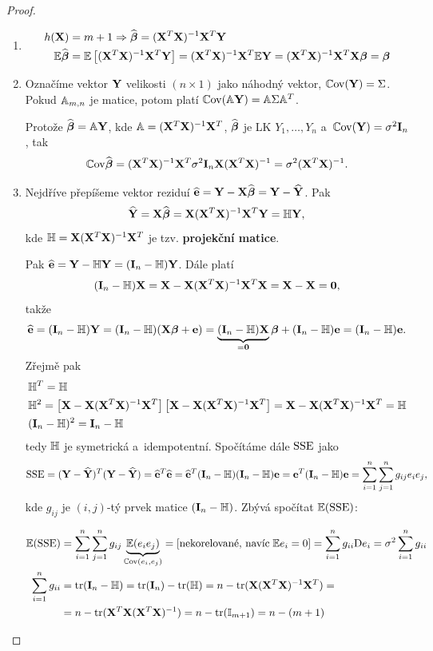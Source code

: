 \begin{proof}
\begin{enumerate}
\item
\begin{align*}
	h(\X) & = m + 1 \Rightarrow \wbetab = (\X^T \X)^{-1} \X^T \Y \\
	\E \wbetab & = \E \left[(\X^T \X)^{-1} \X^T \Y \right] = (\X^T \X)^{-1} \X^T \E\Y = (\X^T \X)^{-1} \X^T \X \betab = \betab
\end{align*}

\item
Označíme vektor $\Y$ velikosti $(n \times 1)$ jako náhodný vektor, $\Cov(\Y) = \Sigma$. Pokud $\Am_{m, n}$ je matice, potom platí $\Cov(\Am \Y) = \Am \Sigma \Am^T$.

Protože $\wbetab = \Am \Y$, kde $\Am = (\X^T \X)^{-1} \X^T$, $\wbetab$ je LK $Y_1, \dots, Y_n$ a~$\Cov(\Y) = \sigma^2 \In$, tak
 $$
	\Cov \wbetab = (\X^T \X)^{-1} \X^T \sigma^2 \In \X (\X^T \X)^{-1} = \sigma^2 (\X^T \X)^{-1}.
 $$

\item
Nejdříve přepíšeme vektor reziduí $\heb = \Y - \X \wbetab = \Y - \hYb$. Pak
$$\hYb = \X \wbetab = \X (\X^T \X)^{-1} \X^T \Y = \Hm \Y,$$
kde $\Hm = \X (\X^T \X)^{-1} \X^T$ je tzv. \textbf{projekční matice}.
 
Pak $\heb = \Y - \Hm \Y = (\In - \Hm) \Y$. Dále platí
$$(\In - \Hm) \X = \X - \X (\X^T \X)^{-1} \X^T \X = \X - \X = \boldsymbol{0},$$
takže
 $$
	\heb = (\In - \Hm) \Y = (\In - \Hm)(\X \betab + \eb) = \underbrace{(\In - \Hm) \X}_{ = \boldsymbol{0}} \betab + (\In - \Hm) \eb = (\In - \Hm) \eb.
 $$
Zřejmě pak
\begin{align*}
& \Hm^T = \Hm \\
& \Hm^2 = \left[\X - \X (\X^T \X)^{-1} \X^T \right] \left[\X - \X (\X^T \X)^{-1} \X^T \right] = \X - \X (\X^T \X)^{-1} \X^T = \Hm \\
& (\In - \Hm)^2 = \In - \Hm
\end{align*}
tedy $\Hm$ je symetrická a~idempotentní. Spočítáme dále $\SSE$ jako
 $$
	\SSE = (\Y - \hYb)^T(\Y - \hYb) = \heb^T \heb = \heb^T (\In - \Hm)(\In - \Hm) \eb = \eb^T (\In - \Hm) \eb = \sumin \sumjn g_{ij} e_i e_j,
 $$
kde $g_{ij}$ je $(i,j)$-tý prvek matice $(\In - \Hm)$. Zbývá spočítat $\E(\SSE)$:

\begin{align*}
	\E(\SSE) & = \sumin \sumjn g_{ij} \underbrace{\E(e_i e_j)}_{\Cov(e_i, e_j)} = \left[\text{nekorelované, navíc\;} \E e_i = 0 \right] = \sumin g_{ii} \D e_i = \sigma^2 \sumin g_{ii} \\
	\sumin g_{ii} & = \trace(\In - \Hm) = \trace(\In) - \trace(\Hm) = n - \trace(\X (\X^T \X)^{-1} \X^T) = \\
	& = n - \trace(\X^T \X (\X^T \X)^{-1}) = n - \trace(\Identita{m+1}) = n - (m + 1)
\end{align*}


\end{enumerate}
\end{proof}
